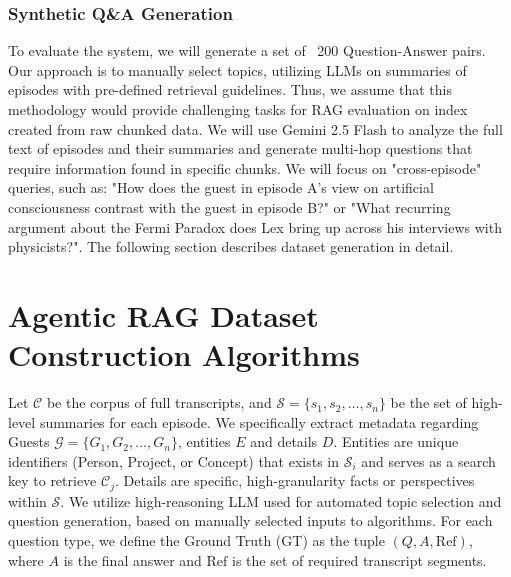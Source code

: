 \documentclass[11pt]{article}
\begin{document}
\subsubsection{Synthetic Q\&A Generation}
To evaluate the system, we will generate a set of ~200 Question-Answer pairs. Our approach is to manually select topics, utilizing LLMs on summaries of episodes with pre-defined retrieval guidelines. Thus, we assume that this methodology would provide challenging tasks for RAG evaluation on index created from raw chunked data. We will use Gemini 2.5 Flash to analyze the full text of episodes and their summaries and generate multi-hop questions that require information found in specific chunks. We will focus on "cross-episode" queries, such as: "How does the guest in episode A's view on artificial consciousness contrast with the guest in episode B?" or "What recurring argument about the Fermi Paradox does Lex bring up across his interviews with physicists?". The following section describes dataset generation in detail.

\section*{Agentic RAG Dataset Construction Algorithms}

Let $\mathcal{C}$ be the corpus of full transcripts, and $\mathcal{S} = \{s_1, s_2, \dots, s_n\}$ be the set of high-level summaries for each episode. We specifically extract metadata regarding Guests $\mathcal{G} = \{G_1, G_2, \dots, G_n\}$, entities $E$ and details $D$. Entities are unique identifiers (Person, Project, or Concept) that exists in $\mathcal{S}_i$ and serves as a search key to retrieve $\mathcal{C}_j$. Details are specific, high-granularity facts or perspectives within $\mathcal{S}$. We utilize high-reasoning LLM used for automated topic selection and question generation, based on manually selected inputs to algorithms. For each question type, we define the Ground Truth (GT) as the tuple $(Q, A, \text{Ref})$, where $A$ is the final answer and $\text{Ref}$ is the set of required transcript segments.


\end{document}
